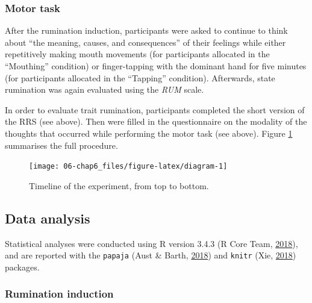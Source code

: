 \documentclass[a4paper,12pt,twoside,openright,oldfontcommands,final]{memoir}
\begin{document}
\hypertarget{proc_supp}{%
\subsubsection{Motor task}\label{proc_supp}}

After the rumination induction, participants were asked to continue to think about \enquote{the meaning, causes, and consequences} of their feelings while either repetitively making mouth movements (for participants allocated in the \enquote{Mouthing} condition) or finger-tapping with the dominant hand for five minutes (for participants allocated in the \enquote{Tapping} condition). Afterwards, state rumination was again evaluated using the \emph{RUM} scale.

In order to evaluate trait rumination, participants completed the short version of the RRS (see above). Then were filled in the questionnaire on the modality of the thoughts that occurred while performing the motor task (see above). Figure \ref{fig:diagram} summarises the full procedure.

\begin{figure}[H]

{\centering \texttt{[image: 06-chap6\_files/figure-latex/diagram-1]} 

}

\caption{Timeline of the experiment, from top to bottom.}\label{fig:diagram}
\end{figure}

\hypertarget{data-analysis-2}{%
\subsection{Data analysis}\label{data-analysis-2}}

Statistical analyses were conducted using R version 3.4.3 (R Core Team, \protect\hyperlink{ref-R-base}{2018}), and are reported with the \texttt{papaja} (Aust \& Barth, \protect\hyperlink{ref-R-papaja}{2018}) and \texttt{knitr} (Xie, \protect\hyperlink{ref-R-knitr}{2018}) packages.

\hypertarget{rumination-induction-2}{%
\subsubsection{Rumination induction}\label{rumination-induction-2}}
\end{document}
